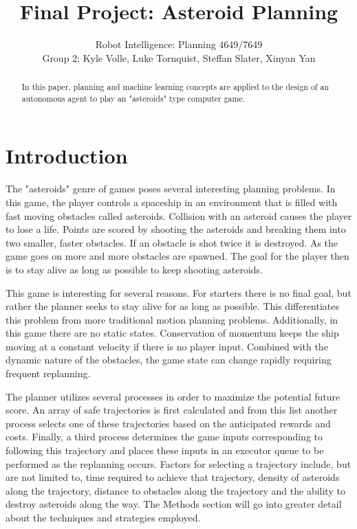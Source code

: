 \documentclass[10pt,final,conference]{IEEEtran}
\begin{document}
\title{Final Project: Asteroid Planning}
\author{Robot Intelligence: Planning 4649/7649 \\
Group 2: Kyle Volle, Luke Tornquist, Steffan Slater, Xinyan Yan}
\maketitle


\newpage

\nocite{*}

\begin{abstract}
In this paper, planning and machine learning concepts are applied to the design of an autonomous agent to play an "asteroids" type computer game. 
\end{abstract}

\section{Introduction}
The "asteroids" genre of games poses several interesting planning problems. In this game, the player controls a spaceship in an environment that is filled with fast moving obstacles called asteroids. Collision with an asteroid causes the player to lose a life. Points are scored by shooting the asteroids and breaking them into two smaller, faster obstacles. If an obstacle is shot twice it is destroyed. As the game goes on more and more obstacles are spawned. The goal for the player then is to stay alive as long as possible to keep shooting asteroids.

This game is interesting for several reasons. For starters there is no final goal, but rather the planner seeks to stay alive for as long as possible. This differentiates this problem from more traditional motion planning problems. Additionally, in this game there are no static states. Conservation of momentum keeps the ship moving at a constant velocity if there is no player input. Combined with the dynamic nature of the obstacles, the game state can change rapidly requiring frequent replanning.

The planner utilizes several processes in order to maximize the potential future score. An array of safe trajectories is first calculated and from this list another process selects one of these trajectories based on the anticipated rewards and costs. Finally, a third process determines the game inputs corresponding to following this trajectory and places these inputs in an executor queue to be performed as the replanning occurs. Factors for selecting a trajectory include, but are not limited to, time required to achieve that trajectory, density of asteroids along the trajectory, distance to obstacles along the trajectory and the ability to destroy asteroids along the way. The Methods section will go into greater detail about the techniques and strategies employed.
\end{document}
